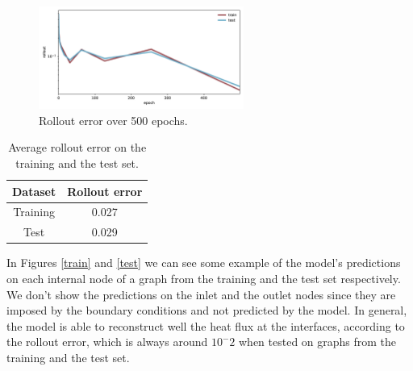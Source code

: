 \documentclass[11pt,a4paper]{article}
\begin{document}
\begin{figure}[H]
    \centering
    \includegraphics[width=0.6\textwidth]{Images/rollout.jpg}
    \caption{Rollout error over 500 epochs.}
    \label{rollout_plot}
\end{figure}

\begin{table}[H]
    \centering
    \begin{tabular}{|c|c|}
        \hline
        \textbf{Dataset} & \textbf{Rollout error} \\
        \hline
        Training & 0.027 \\
        Test & 0.029 \\
        \hline
    \end{tabular}
    \caption{Average rollout error on the training and the test set.}
    \label{errors}
\end{table}

In Figures \ref{train} and \ref{test} we can see some example of the model's predictions on each internal node of a graph from the training and the test set respectively. We don't show the predictions on the inlet and the outlet nodes since they are imposed by the boundary conditions and not predicted by the model.
In general, the model is able to reconstruct well the heat flux at the interfaces, according to the rollout error, which is always around \(10^-2\) when tested on graphs from the training and the test set. 
\end{document}
